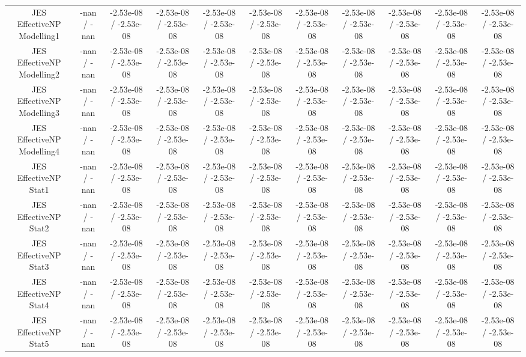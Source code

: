 \begin{table}[htbp]
\begin{center}
\begin{tabular}{|c|c|c|c|c|c|c|c|c|c|c|}
  JES EffectiveNP Modelling1 & -nan / -nan & -2.53e-08 / -2.53e-08 & -2.53e-08 / -2.53e-08 & -2.53e-08 / -2.53e-08 & -2.53e-08 / -2.53e-08 & -2.53e-08 / -2.53e-08 & -2.53e-08 / -2.53e-08 & -2.53e-08 / -2.53e-08 & -2.53e-08 / -2.53e-08 & -2.53e-08 / -2.53e-08 \\ 
  JES EffectiveNP Modelling2 & -nan / -nan & -2.53e-08 / -2.53e-08 & -2.53e-08 / -2.53e-08 & -2.53e-08 / -2.53e-08 & -2.53e-08 / -2.53e-08 & -2.53e-08 / -2.53e-08 & -2.53e-08 / -2.53e-08 & -2.53e-08 / -2.53e-08 & -2.53e-08 / -2.53e-08 & -2.53e-08 / -2.53e-08 \\ 
  JES EffectiveNP Modelling3 & -nan / -nan & -2.53e-08 / -2.53e-08 & -2.53e-08 / -2.53e-08 & -2.53e-08 / -2.53e-08 & -2.53e-08 / -2.53e-08 & -2.53e-08 / -2.53e-08 & -2.53e-08 / -2.53e-08 & -2.53e-08 / -2.53e-08 & -2.53e-08 / -2.53e-08 & -2.53e-08 / -2.53e-08 \\ 
  JES EffectiveNP Modelling4 & -nan / -nan & -2.53e-08 / -2.53e-08 & -2.53e-08 / -2.53e-08 & -2.53e-08 / -2.53e-08 & -2.53e-08 / -2.53e-08 & -2.53e-08 / -2.53e-08 & -2.53e-08 / -2.53e-08 & -2.53e-08 / -2.53e-08 & -2.53e-08 / -2.53e-08 & -2.53e-08 / -2.53e-08 \\ 
  JES EffectiveNP Stat1 & -nan / -nan & -2.53e-08 / -2.53e-08 & -2.53e-08 / -2.53e-08 & -2.53e-08 / -2.53e-08 & -2.53e-08 / -2.53e-08 & -2.53e-08 / -2.53e-08 & -2.53e-08 / -2.53e-08 & -2.53e-08 / -2.53e-08 & -2.53e-08 / -2.53e-08 & -2.53e-08 / -2.53e-08 \\ 
  JES EffectiveNP Stat2 & -nan / -nan & -2.53e-08 / -2.53e-08 & -2.53e-08 / -2.53e-08 & -2.53e-08 / -2.53e-08 & -2.53e-08 / -2.53e-08 & -2.53e-08 / -2.53e-08 & -2.53e-08 / -2.53e-08 & -2.53e-08 / -2.53e-08 & -2.53e-08 / -2.53e-08 & -2.53e-08 / -2.53e-08 \\ 
  JES EffectiveNP Stat3 & -nan / -nan & -2.53e-08 / -2.53e-08 & -2.53e-08 / -2.53e-08 & -2.53e-08 / -2.53e-08 & -2.53e-08 / -2.53e-08 & -2.53e-08 / -2.53e-08 & -2.53e-08 / -2.53e-08 & -2.53e-08 / -2.53e-08 & -2.53e-08 / -2.53e-08 & -2.53e-08 / -2.53e-08 \\ 
  JES EffectiveNP Stat4 & -nan / -nan & -2.53e-08 / -2.53e-08 & -2.53e-08 / -2.53e-08 & -2.53e-08 / -2.53e-08 & -2.53e-08 / -2.53e-08 & -2.53e-08 / -2.53e-08 & -2.53e-08 / -2.53e-08 & -2.53e-08 / -2.53e-08 & -2.53e-08 / -2.53e-08 & -2.53e-08 / -2.53e-08 \\ 
  JES EffectiveNP Stat5 & -nan / -nan & -2.53e-08 / -2.53e-08 & -2.53e-08 / -2.53e-08 & -2.53e-08 / -2.53e-08 & -2.53e-08 / -2.53e-08 & -2.53e-08 / -2.53e-08 & -2.53e-08 / -2.53e-08 & -2.53e-08 / -2.53e-08 & -2.53e-08 / -2.53e-08 & -2.53e-08 / -2.53e-08 \\ 

\end{tabular}
\end{center}
\end{table}
